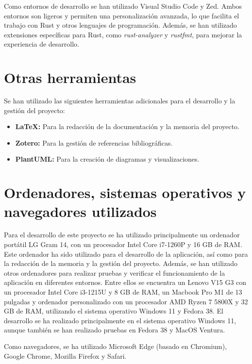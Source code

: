 Como entornos de desarrollo se han utilizado Visual Studio Code y Zed. Ambos entornos son ligeros y permiten una personalización avanzada, lo que facilita el trabajo con Rust y otros lenguajes de programación. Además, se han utilizado extensiones específicas para Rust, como \textit{rust-analyzer} y \textit{rustfmt}, para mejorar la experiencia de desarrollo.

\section{Otras herramientas}
Se han utilizado las siguientes herramientas adicionales para el desarrollo y la gestión del proyecto:

\begin{itemize}
    \item \textbf{LaTeX:} Para la redacción de la documentación y la memoria del proyecto.
    \item \textbf{Zotero:} Para la gestión de referencias bibliográficas.
    \item \textbf{PlantUML:} Para la creación de diagramas y visualizaciones.
\end{itemize}

\section{Ordenadores, sistemas operativos y navegadores utilizados}

Para el desarrollo de este proyecto se ha utilizado principalmente un ordenador portátil LG Gram 14, con un procesador Intel Core i7-1260P y 16 GB de RAM. Este ordenador ha sido utilizado para el desarrollo de la aplicación, así como para la redacción de la memoria y la gestión del proyecto. Además, se han utilizado otros ordenadores para realizar pruebas y verificar el funcionamiento de la aplicación en diferentes entornos. Entre ellos se encuentra un Lenovo V15 G3 con un procesador Intel Core i3-1215U y 8 GB de RAM, un Macbook Pro M1 de 13 pulgadas y ordenador personalizado con un procesador AMD Ryzen 7 5800X y 32 GB de RAM, utilizando el sistema operativo Windows 11 y Fedora 38. El desarrollo se ha realizado principalmente en el sistema operativo Windows 11, aunque también se han realizado pruebas en Fedora 38 y MacOS Ventura.

Como navegadores, se ha utilizado Microsoft Edge (basado en Chromium), Google Chrome, Mozilla Firefox y Safari.